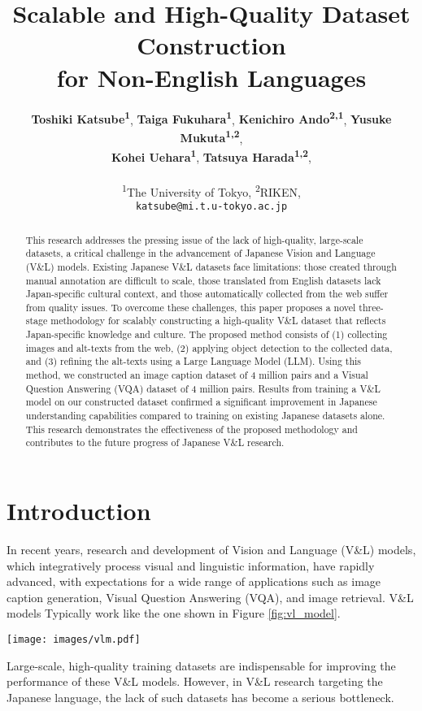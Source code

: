 \documentclass[11pt]{article}
\title{Scalable and High-Quality Dataset Construction \\ for Non-English Languages}
\author{
 \textbf{Toshiki Katsube\textsuperscript{1}},
 \textbf{Taiga Fukuhara\textsuperscript{1}},
 \textbf{Kenichiro Ando\textsuperscript{2,1}},
 \textbf{Yusuke Mukuta\textsuperscript{1,2}},
\\
 \textbf{Kohei Uehara\textsuperscript{1}},
 \textbf{Tatsuya Harada\textsuperscript{1,2}},
\\
\\
 \textsuperscript{1}The University of Tokyo,
 \textsuperscript{2}RIKEN,
\\
\texttt{katsube@mi.t.u-tokyo.ac.jp}
}
\begin{document}
\maketitle
\begin{abstract}
  This research addresses the pressing issue of the lack of high-quality, large-scale datasets, a critical challenge in the advancement of Japanese Vision and Language (V\&L) models. Existing Japanese V\&L datasets face limitations: those created through manual annotation are difficult to scale, those translated from English datasets lack Japan-specific cultural context, and those automatically collected from the web suffer from quality issues. To overcome these challenges, this paper proposes a novel three-stage methodology for scalably constructing a high-quality V\&L dataset that reflects Japan-specific knowledge and culture. The proposed method consists of (1) collecting images and alt-texts from the web, (2) applying object detection to the collected data, and (3) refining the alt-texts using a Large Language Model (LLM). Using this method, we constructed an image caption dataset of 4 million pairs and a Visual Question Answering (VQA) dataset of 4 million pairs. Results from training a V\&L model on our constructed dataset confirmed a significant improvement in Japanese understanding capabilities compared to training on existing Japanese datasets alone. This research demonstrates the effectiveness of the proposed methodology and contributes to the future progress of Japanese V\&L research.
\end{abstract}

\section{Introduction}

In recent years, research and development of Vision and Language (V\&L) models, which integratively process visual and linguistic information, have rapidly advanced, with expectations for a wide range of applications such as image caption generation, Visual Question Answering (VQA), and image retrieval. V\&L models Typically work like the one shown in Figure \ref{fig:vl_model}.

\begin{figure*}[t]
  \centering
  \texttt{[image: images/vlm.pdf]}
  \caption{How V\&L Models Work}
  \label{fig:vl_model}
\end{figure*}

Large-scale, high-quality training datasets are indispensable for improving the performance of these V\&L models. However, in V\&L research targeting the Japanese language, the lack of such datasets has become a serious bottleneck.
\end{document}
